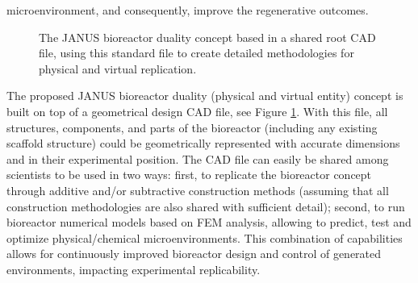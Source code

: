 microenvironment, and consequently, improve the regenerative outcomes.

\begin{figure}
\caption{The JANUS bioreactor duality concept based in a shared root \acs{CAD} file, using this standard file to create detailed methodologies for physical and virtual replication.}
\label{figCadFile}
\end{figure}  

The proposed JANUS bioreactor duality (physical and virtual entity) concept is built on top of a geometrical design \acs{CAD} file, see Figure \ref{figCadFile}. With this file, all structures, components, and parts of the bioreactor (including any existing scaffold structure) could be geometrically represented with accurate dimensions and in their experimental position. The \acs{CAD} file can easily be shared among scientists to be used in two ways: first, to replicate the bioreactor concept through additive and/or subtractive construction methods (assuming that all construction methodologies are also shared with sufficient detail); second, to run bioreactor numerical models based on \acs{FEM} analysis, allowing to predict, test and optimize physical/chemical microenvironments. This combination of capabilities allows for continuously improved bioreactor design and control of generated environments, impacting experimental replicability.




